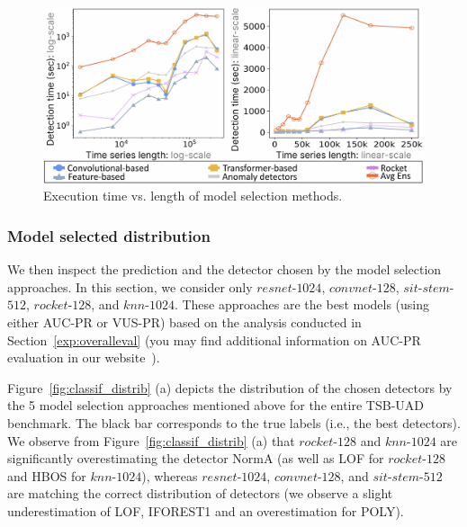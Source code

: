 \begin{figure}
    \centering
    \includegraphics[width=\linewidth]{figures/Fig7.jpg}
        \caption{Execution time vs. length of model selection methods.}%
        \label{fig:scalability}
\end{figure}

\subsubsection{\textbf{Model selected distribution}}
\label{exp:distribution}

We then inspect the prediction and the detector chosen by the model selection approaches. In this section, we consider only $resnet$-$1024$, $convnet$-$128$, $sit$-$stem$-$512$, $rocket$-$128$, and $knn$-$1024$. These approaches are the best models (using either AUC-PR or VUS-PR) based on the analysis conducted in Section~\ref{exp:overalleval} (you may find additional information on AUC-PR evaluation in our website~\cite{ourwebsite}).

Figure~\ref{fig:classif_distrib} (a) depicts the distribution of the chosen detectors by the 5 model selection approaches mentioned above for the entire TSB-UAD benchmark. The black bar corresponds to the true labels (i.e., the best detectors). We observe from Figure~\ref{fig:classif_distrib} (a) that $rocket$-$128$ and $knn$-$1024$ are significantly overestimating the detector NormA (as well as LOF for $rocket$-$128$ and HBOS for $knn$-$1024$), whereas $resnet$-$1024$, $convnet$-$128$, and $sit$-$stem$-$512$ are matching the correct distribution of detectors (we observe a slight underestimation of LOF, IFOREST1 and an overestimation for POLY).

